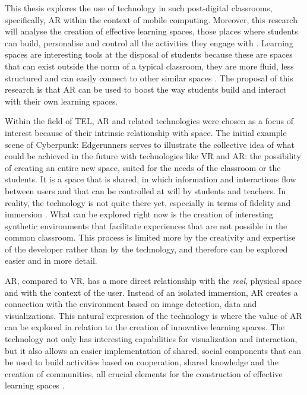 This thesis explores the use of technology in such post-digital classrooms, specifically, \acf{AR} within the
context of mobile computing. Moreover, this research will analyse the creation of effective learning spaces, those places where
students can build, personalise and control all the activities they engage with \parencite{gourlay_2016}. Learning spaces are
interesting tools at the disposal of students because these are spaces that can exist outside the norm of a typical classroom,
they are more fluid, less structured and can easily connect to other similar spaces \parencite{norgard_2022}. The proposal of
this research is that \ac{AR} can be used to boost the way students build and interact with their own learning spaces.

Within the field of \acf{TEL}, \ac{AR} and related technologies were chosen as a focus of interest
because of their intrinsic relationship with space. The initial example scene of Cyberpunk: Edgerunners serves to illustrate the
collective idea of what could be achieved in the future with technologies like \ac{VR} and \ac{AR}: the possibility of creating an
entire new space, suited for the needs of the classroom or the students. It is a space that is shared, in which information and
interactions flow between users and that can be controlled at will by students and teachers. In reality, the technology is not quite
there yet, especially in terms of fidelity and immersion \parencite{hamad_2022,checa_2020}. What can be explored right now is the
creation of interesting synthetic environments that facilitate experiences that are not possible in the common classroom.
This process is limited more by the creativity and expertise of the developer rather than by the technology, and therefore can be
explored easier and in more detail.

\ac{AR}, compared to \ac{VR}, has a more direct relationship with the \emph{real}, physical space and with the context of the user.
Instead of an isolated immersion, \ac{AR} creates a connection with the environment based on image detection, data and visualizations.
This natural expression of the technology is where the value of \ac{AR} can be explored in relation to the creation of innovative
learning spaces. The technology not only has interesting capabilities for visualization and interaction, but it also allows an easier
implementation of shared, social components that can be used to build activities based on cooperation, shared knowledge and
the creation of communities, all crucial elements for the construction of effective learning spaces \parencite{bligh_2017}.

